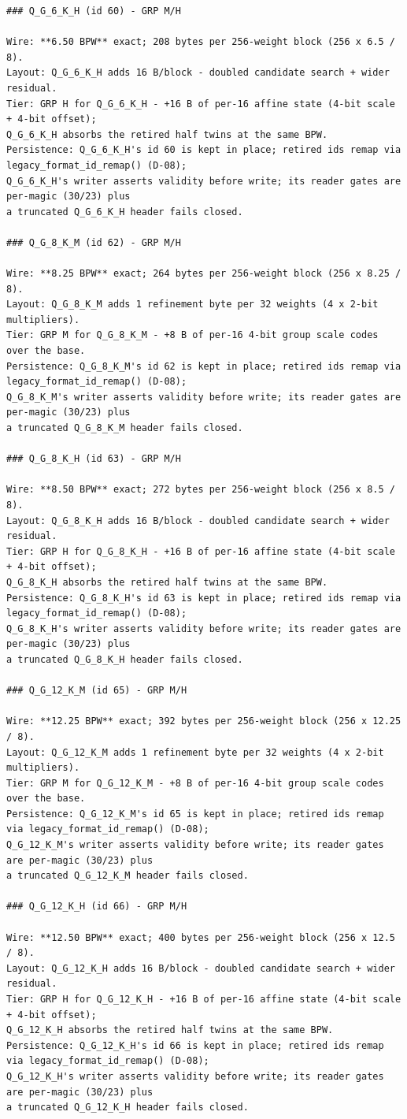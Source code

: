 \begin{Verbatim}[breaklines,breakanywhere,fontsize=\footnotesize]
### Q_G_6_K_H (id 60) - GRP M/H

Wire: **6.50 BPW** exact; 208 bytes per 256-weight block (256 x 6.5 / 8).
Layout: Q_G_6_K_H adds 16 B/block - doubled candidate search + wider residual.
Tier: GRP H for Q_G_6_K_H - +16 B of per-16 affine state (4-bit scale + 4-bit offset);
Q_G_6_K_H absorbs the retired half twins at the same BPW.
Persistence: Q_G_6_K_H's id 60 is kept in place; retired ids remap via legacy_format_id_remap() (D-08);
Q_G_6_K_H's writer asserts validity before write; its reader gates are per-magic (30/23) plus
a truncated Q_G_6_K_H header fails closed.

### Q_G_8_K_M (id 62) - GRP M/H

Wire: **8.25 BPW** exact; 264 bytes per 256-weight block (256 x 8.25 / 8).
Layout: Q_G_8_K_M adds 1 refinement byte per 32 weights (4 x 2-bit multipliers).
Tier: GRP M for Q_G_8_K_M - +8 B of per-16 4-bit group scale codes over the base.
Persistence: Q_G_8_K_M's id 62 is kept in place; retired ids remap via legacy_format_id_remap() (D-08);
Q_G_8_K_M's writer asserts validity before write; its reader gates are per-magic (30/23) plus
a truncated Q_G_8_K_M header fails closed.

### Q_G_8_K_H (id 63) - GRP M/H

Wire: **8.50 BPW** exact; 272 bytes per 256-weight block (256 x 8.5 / 8).
Layout: Q_G_8_K_H adds 16 B/block - doubled candidate search + wider residual.
Tier: GRP H for Q_G_8_K_H - +16 B of per-16 affine state (4-bit scale + 4-bit offset);
Q_G_8_K_H absorbs the retired half twins at the same BPW.
Persistence: Q_G_8_K_H's id 63 is kept in place; retired ids remap via legacy_format_id_remap() (D-08);
Q_G_8_K_H's writer asserts validity before write; its reader gates are per-magic (30/23) plus
a truncated Q_G_8_K_H header fails closed.

### Q_G_12_K_M (id 65) - GRP M/H

Wire: **12.25 BPW** exact; 392 bytes per 256-weight block (256 x 12.25 / 8).
Layout: Q_G_12_K_M adds 1 refinement byte per 32 weights (4 x 2-bit multipliers).
Tier: GRP M for Q_G_12_K_M - +8 B of per-16 4-bit group scale codes over the base.
Persistence: Q_G_12_K_M's id 65 is kept in place; retired ids remap via legacy_format_id_remap() (D-08);
Q_G_12_K_M's writer asserts validity before write; its reader gates are per-magic (30/23) plus
a truncated Q_G_12_K_M header fails closed.

### Q_G_12_K_H (id 66) - GRP M/H

Wire: **12.50 BPW** exact; 400 bytes per 256-weight block (256 x 12.5 / 8).
Layout: Q_G_12_K_H adds 16 B/block - doubled candidate search + wider residual.
Tier: GRP H for Q_G_12_K_H - +16 B of per-16 affine state (4-bit scale + 4-bit offset);
Q_G_12_K_H absorbs the retired half twins at the same BPW.
Persistence: Q_G_12_K_H's id 66 is kept in place; retired ids remap via legacy_format_id_remap() (D-08);
Q_G_12_K_H's writer asserts validity before write; its reader gates are per-magic (30/23) plus
a truncated Q_G_12_K_H header fails closed.


\end{Verbatim}

